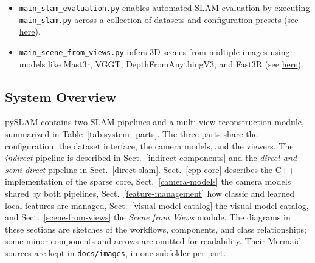 \documentclass{article}
\begin{document}
\begin{itemize}
  \texttt{main\_map\_dense\_reconstruction.py} reloads a saved map and
  uses a configured volumetric integrator to obtain a dense
  reconstruction (see
  \protect\hyperlink{volumetric-reconstruction}{here}).
  \item
  \texttt{main\_slam\_evaluation.py} enables automated SLAM evaluation
  by executing \texttt{main\_slam.py} across a collection of datasets
  and configuration presets (see
  \protect\hyperlink{evaluating-slam}{here}).
  \item
  \texttt{main\_scene\_from\_views.py} infers 3D scenes from multiple
  images using models like Mast3r, VGGT, DepthFromAnythingV3, and Fast3R (see
  \protect\hyperlink{scene-from-views}{here}).
\end{itemize}

\subsection{System Overview}\label{system_overview}

pySLAM contains two SLAM pipelines and a multi-view reconstruction module, summarized in Table~\ref{tab:system_parts}. The three parts share the configuration, the dataset interface, the camera models, and the viewers. The \textit{indirect} pipeline is described in Sect.~\ref{indirect-components} and the \textit{direct and semi-direct} pipeline in Sect.~\ref{direct-slam}. Sect.~\ref{cpp-core} describes the C++ implementation of the sparse core, Sect.~\ref{camera-models} the camera models shared by both pipelines, Sect.~\ref{feature-management} how classic and learned local features are managed, Sect.~\ref{visual-model-catalog} the visual model catalog, and Sect.~\ref{scene-from-views} the \textit{Scene from Views} module. The diagrams in these sections are sketches of the workflows, components, and class relationships; some minor components and arrows are omitted for readability. Their Mermaid sources are kept in \texttt{docs/images}, in one subfolder per part.
\end{document}
